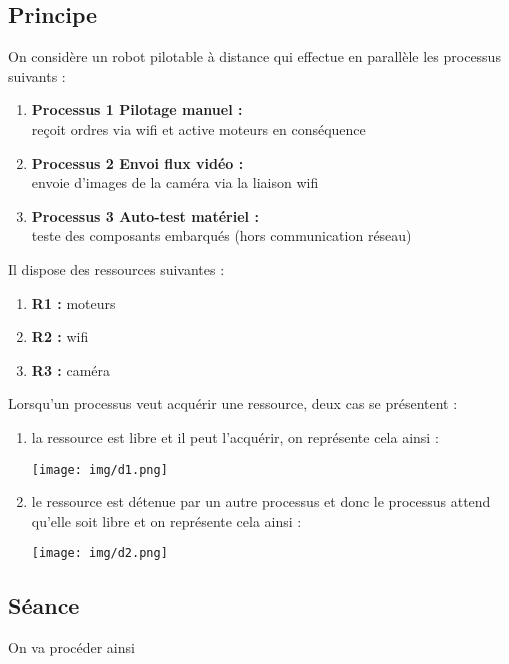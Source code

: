 \documentclass[a4paper,10pt,french]{book}
\begin{document}




\subsection*{Principe}
On considère un robot pilotable à distance qui effectue en parallèle les processus suivants :
\begin{enumerate}[--]
	\item 	\textbf{Processus 1  Pilotage manuel : }\\ reçoit ordres via wifi et active moteurs en conséquence
	\item 	\textbf{Processus 2  Envoi flux vidéo : }\\ envoie d'images de la caméra via la liaison wifi
    \item 	\textbf{Processus 3  Auto-test matériel : }\\ teste des composants embarqués (hors communication réseau)
\end{enumerate}
Il dispose des ressources suivantes :
\begin{enumerate}[--]
	\item 	\textbf{R1 : }  moteurs
	\item 	\textbf{R2 : }  wifi
    \item 	\textbf{R3 : }	caméra
\end{enumerate}

Lorsqu'un processus veut acquérir une ressource, deux cas se présentent :
\begin{enumerate}[--]
	\item 	la ressource est libre et il peut l'acquérir, on représente cela ainsi :
			\begin{center}
			\texttt{[image: img/d1.png]}
			\end{center}
	\item 	le ressource est détenue par un autre processus et donc le processus attend qu'elle soit libre et on représente cela ainsi :
	\begin{center}
			\texttt{[image: img/d2.png]}
			\end{center}
\end{enumerate}

\subsection*{Séance}

On va procéder ainsi
\end{document}
